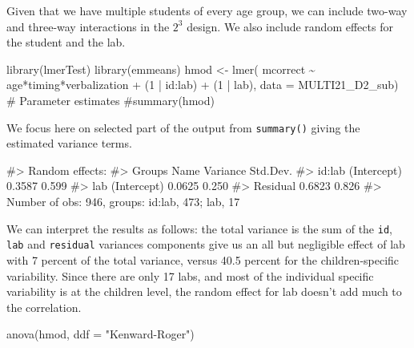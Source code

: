 \documentclass[
  11pt,
  letterpaper,
]{scrbook}
\newenvironment{Shaded}{\begin{snugshade}}{\end{snugshade}}
\newcommand{\AttributeTok}[1]{\textcolor[rgb]{0.40,0.45,0.13}{#1}}
\newcommand{\CommentTok}[1]{\textcolor[rgb]{0.37,0.37,0.37}{#1}}
\newcommand{\DecValTok}[1]{\textcolor[rgb]{0.68,0.00,0.00}{#1}}
\newcommand{\FunctionTok}[1]{\textcolor[rgb]{0.28,0.35,0.67}{#1}}
\newcommand{\NormalTok}[1]{\textcolor[rgb]{0.00,0.23,0.31}{#1}}
\newcommand{\OtherTok}[1]{\textcolor[rgb]{0.00,0.23,0.31}{#1}}
\newcommand{\SpecialCharTok}[1]{\textcolor[rgb]{0.37,0.37,0.37}{#1}}
\newcommand{\StringTok}[1]{\textcolor[rgb]{0.13,0.47,0.30}{#1}}
\theoremstyle{definition}
\theoremstyle{remark}
\begin{document}
Given that we have multiple students of every age group, we can include
two-way and three-way interactions in the \(2^3\) design. We also
include random effects for the student and the lab.

\begin{Shaded}
\begin{Highlighting}[]
\FunctionTok{library}\NormalTok{(lmerTest)}
\FunctionTok{library}\NormalTok{(emmeans)}
\NormalTok{hmod }\OtherTok{\textless{}{-}} \FunctionTok{lmer}\NormalTok{(}
\NormalTok{  mcorrect }\SpecialCharTok{\textasciitilde{}}\NormalTok{ age}\SpecialCharTok{*}\NormalTok{timing}\SpecialCharTok{*}\NormalTok{verbalization }\SpecialCharTok{+}\NormalTok{ (}\DecValTok{1} \SpecialCharTok{|}\NormalTok{ id}\SpecialCharTok{:}\NormalTok{lab) }\SpecialCharTok{+}\NormalTok{ (}\DecValTok{1} \SpecialCharTok{|}\NormalTok{ lab), }
  \AttributeTok{data =}\NormalTok{ MULTI21\_D2\_sub)}
\CommentTok{\# Parameter estimates}
\CommentTok{\#summary(hmod)}
\end{Highlighting}
\end{Shaded}

We focus here on selected part of the output from \texttt{summary()}
giving the estimated variance terms.

\begin{Shaded}
\begin{Highlighting}[]
\CommentTok{\#\textgreater{} Random effects:}
\CommentTok{\#\textgreater{}  Groups   Name        Variance Std.Dev.}
\CommentTok{\#\textgreater{}  id:lab   (Intercept) 0.3587   0.599   }
\CommentTok{\#\textgreater{}  lab      (Intercept) 0.0625   0.250   }
\CommentTok{\#\textgreater{}  Residual             0.6823   0.826   }
\CommentTok{\#\textgreater{} Number of obs: 946, groups:  id:lab, 473; lab, 17}
\end{Highlighting}
\end{Shaded}

We can interpret the results as follows: the total variance is the sum
of the \texttt{id}, \texttt{lab} and \texttt{residual} variances
components give us an all but negligible effect of lab with 7 percent of
the total variance, versus 40.5 percent for the children-specific
variability. Since there are only 17 labs, and most of the individual
specific variability is at the children level, the random effect for lab
doesn't add much to the correlation.

\begin{Shaded}
\begin{Highlighting}[]
\FunctionTok{anova}\NormalTok{(hmod, }\AttributeTok{ddf =} \StringTok{"Kenward{-}Roger"}\NormalTok{)}
\end{Highlighting}
\end{Shaded}
\end{document}
